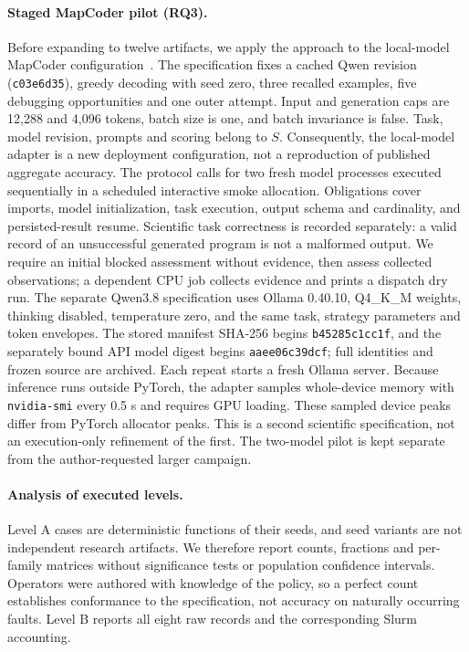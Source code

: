\documentclass[pdflatex,sn-mathphys-num]{sn-jnl}
\theoremstyle{thmstylethree}
\newcommand{\code}[1]{\texttt{#1}}
\begin{document}
\paragraph{Staged MapCoder pilot (RQ3).} Before expanding to twelve artifacts, we apply the approach to the local-model MapCoder configuration~\cite{resaiartifact7}. The specification fixes a cached Qwen revision (\code{c03e6d35}), greedy decoding with seed zero, three recalled examples, five debugging opportunities and one outer attempt. Input and generation caps are 12,288 and 4,096 tokens, batch size is one, and batch invariance is false. Task, model revision, prompts and scoring belong to $S$. Consequently, the local-model adapter is a new deployment configuration, not a reproduction of published aggregate accuracy. The protocol calls for two fresh model processes executed sequentially in a scheduled interactive smoke allocation. Obligations cover imports, model initialization, task execution, output schema and cardinality, and persisted-result resume. Scientific task correctness is recorded separately: a valid record of an unsuccessful generated program is not a malformed output. We require an initial blocked assessment without evidence, then assess collected observations; a dependent CPU job collects evidence and prints a dispatch dry run. The separate Qwen3.8 specification uses Ollama 0.40.10, Q4\_K\_M weights, thinking disabled, temperature zero, and the same task, strategy parameters and token envelopes. The stored manifest SHA-256 begins \code{b45285c1cc1f}, and the separately bound API model digest begins \code{aaee06c39dcf}; full identities and frozen source are archived. Each repeat starts a fresh Ollama server. Because inference runs outside PyTorch, the adapter samples whole-device memory with \code{nvidia-smi} every 0.5 s and requires GPU loading. These sampled device peaks differ from PyTorch allocator peaks. This is a second scientific specification, not an execution-only refinement of the first. The two-model pilot is kept separate from the author-requested larger campaign.

\paragraph{Analysis of executed levels.} Level A cases are deterministic functions of their seeds, and seed variants are not independent research artifacts. We therefore report counts, fractions and per-family matrices without significance tests or population confidence intervals. Operators were authored with knowledge of the policy, so a perfect count establishes conformance to the specification, not accuracy on naturally occurring faults. Level B reports all eight raw records and the corresponding Slurm accounting.
\end{document}
